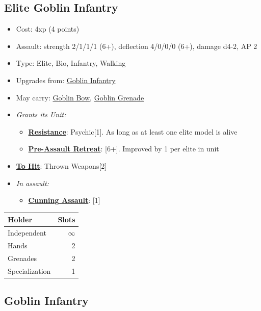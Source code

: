 \documentclass[a4paper,12pt]{article}
\begin{document}
\subsection{Elite Goblin Infantry}
\label{model-elite-goblin-infantry}

\begin{itemize}
\item Cost: 4xp (4 points)
\item Assault: strength 2/1/1/1 (6+), deflection 4/0/0/0 (6+), damage d4-2, AP 2
\item Type: Elite, Bio, Infantry, Walking
\item Upgrades from: \hyperref[model-goblin-infantry]{Goblin Infantry}
\item May carry: \hyperref[equipment-goblin-bow]{Goblin Bow}, \hyperref[equipment-goblin-grenade]{Goblin Grenade}

\item \textit{Grants its Unit:}
\begin{itemize}
\item \textbf{\hyperref[rule-special-resistance]{Resistance}}: Psychic[1]. As long as at least one elite model is alive
\item \textbf{\hyperref[rule-special-pre-assault-retreat]{Pre-Assault Retreat}}: [6+]. Improved by 1 per elite in unit

\end{itemize}

\item \textbf{\hyperref[rule-special-to-hit]{To Hit}}: Thrown Weapons[2]

\item \textit{In assault:}
\begin{itemize}
\item \textbf{\hyperref[rule-special-cunning-assault]{Cunning Assault}}: [1]

\end{itemize}

\end{itemize}

\begin{tabular}{lr}
\textbf{Holder} & \textbf{Slots} \\
\hline
Independent & $\infty$ \\
Hands & 2 \\
Grenades & 2 \\
Specialization & 1 \\
\end{tabular}
\vspace{1ex}
\subsection{Goblin Infantry}
\label{model-goblin-infantry}
\end{document}
